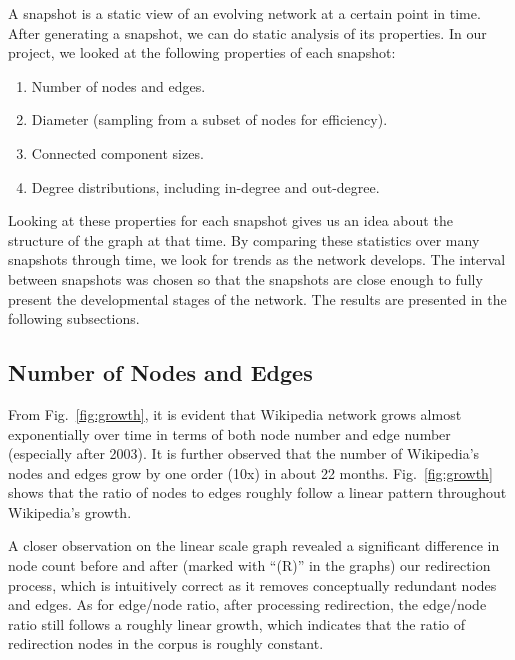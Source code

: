 \documentclass[10pt,twocolumn]{article}
\begin{document}
A snapshot is a static view of an evolving network at a certain point in time. After generating a snapshot, we can do static analysis of its properties. In our project, we looked at the following properties of each snapshot:
\begin{enumerate}
\item Number of nodes and edges.
\item Diameter (sampling from a subset of nodes for efficiency).
\item Connected component sizes.
\item Degree distributions, including in-degree and out-degree.
\end{enumerate}

Looking at these properties for each snapshot gives us an idea about the structure of the graph at that time. By comparing these statistics over many snapshots through time, we look for trends as the network develops. The interval between snapshots was chosen so that the snapshots are close enough to fully present the developmental stages of the network. The results are presented in the following subsections.

\subsection{Number of Nodes and Edges}
From Fig.~\ref{fig:growth}, it is evident that Wikipedia network grows almost exponentially over time in terms of both node number and edge number (especially after 2003). It is further observed that the number of Wikipedia's nodes and edges grow by one order (10x) in about 22 months. Fig.~\ref{fig:growth} shows that the ratio of nodes to edges roughly follow a linear pattern throughout Wikipedia's growth.

A closer observation on the linear scale graph revealed a significant difference in node count before and after (marked with ``(R)'' in the graphs) our redirection process, which is intuitively correct as it removes conceptually redundant nodes and edges. As for edge/node ratio, after processing redirection, the edge/node ratio still follows a roughly linear growth, which indicates that the ratio of redirection nodes in the corpus is roughly constant.
\end{document}

